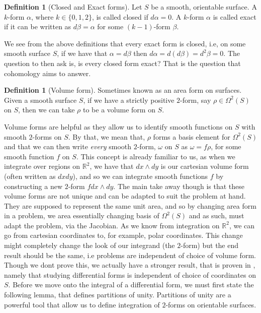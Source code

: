 \documentclass[11pt]{report}
\theoremstyle{definition}
\newtheorem{defn}[thm]{Definition}
\begin{document}
\begin{defn}[Closed and Exact forms]
  Let $S$ be a smooth, orientable surface. A $k$-form $\alpha$, where $k \in \{0,1,2\}$, is called closed if $d\alpha = 0$. A $k$-form $\alpha$ is called exact if it can be written as $d\beta = \alpha$ for some $(k-1)$-form $\beta$.
\end{defn}
We see from the above definitions that every exact form is closed, i.e, on some smooth surface $S$, if we have that $\alpha = d\beta $ then $d\alpha = d(d\beta) = d^2\beta = 0$. The question to then ask is, is every closed form exact? That is the question that cohomology aims to answer.
\begin{defn}[Volume form]\label{volumeform}
  Sometimes known as an area form on surfaces. Given a smooth surface $S$, if we have a strictly positive $2$-form, say $\rho \in \Omega^2(S)$ on $S$, then we can take $\rho$ to be a volume form on $S$. 
\end{defn}
Volume forms are helpful as they allow us to identify smooth functions on $S$ with smooth $2$-forms on $S$. By that, we mean that, $\rho$ forms a basis element for $\Omega^2(S)$ and that we can then write \emph{every} smooth $2$-form, $\omega$ on $S$ as $\omega = f\rho$, for some smooth function $f$ on $S$. This concept is already familiar to us, as when we integrate over regions on $\mathbb{R}^2$, we have that $dx\wedge dy$ is our cartesian volume form (often written as $dxdy$), and so we can integrate smooth functions $f$ by constructing a new $2$-form $fdx\wedge dy$. The main take away though is that these volume forms are not unique and can be adapted to suit the problem at hand. They are supposed to represent the same unit area, and so by changing area form in a problem, we area essentially changing basis of $\Omega^2(S)$ and as such, must adapt the problem, via the Jacobian. As we know from integration on $\mathbb{R}^2$, we can go from cartesian coordinates to, for example, polar coordinates. This change might completely change the look of our integrand (the $2$-form) but the end result should be the same, i.e problems are independent of choice of volume form. Though we dont prove this, we actually have a stronger result, that is proven in \cite{calcohomo}, namely that studying differential forms is independent of choice of coordinates on $S$. Before we move onto the integral of a differential form, we must first state the following lemma, that defines partitions of unity. Partitions of unity are a powerful tool that allow us to define integration of $2$-forms on orientable surfaces.
\end{document}
